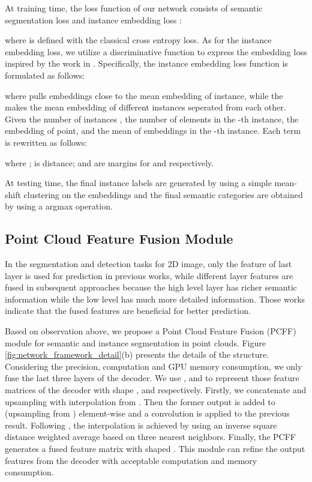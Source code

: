 \documentclass[letterpaper]{article} \usepackage{aaai20}  \usepackage{times}  \usepackage{helvet} \usepackage{courier}  \usepackage[hyphens]{url}  \usepackage{graphicx} \urlstyle{rm} \def\UrlFont{\rm}  \usepackage{graphicx}  \frenchspacing  \setlength{\pdfpagewidth}{8.5in}  \setlength{\pdfpageheight}{11in}
\begin{document}
At training time, the loss function  of our network consists of semantic segmentation loss  and instance embedding loss :

where  is defined with the classical cross entropy loss. As for the instance embedding loss, we utilize a discriminative function to express the embedding loss  inspired by the work in \cite{de2017semantic}. Specifically, the instance embedding loss function is formulated as follows:

where  pulls embeddings close to the mean embedding of instance, while the  makes the mean embedding of different instances seperated from each other. Given the number of instances , the number of elements  in the -th instance, the embedding  of point, and the mean of embeddings  in the -th instance. Each term is rewritten as follows:


where ;  is  distance;  and  are margins for  and  respectively.

At testing time, the final instance labels are generated by using a simple mean-shift clustering \cite{comaniciu2002mean} on the embeddings and the final semantic categories are obtained by using a argmax operation.

\subsection{Point Cloud Feature Fusion Module}
In the segmentation and detection tasks for 2D image, only the feature of last layer is used for prediction in previous works, while different layer features are fused in subsequent approaches  \cite{Lin_2017_CVPR,he2017mask,deeplabv3plus2018} because the high level layer has richer semantic information while the low level has much more detailed information. Those works indicate that the fused features are beneficial for better prediction.

Based on observation above, we propose a Point Cloud Feature Fusion (PCFF) module for semantic and instance segmentation in point clouds. Figure \ref{fig:network_framework_detail}(b) presents the details of the structure. Considering the precision, computation and GPU memory consumption, we only fuse the last three layers of the decoder. We use ,  and  to represent those feature matrices of the decoder with shape ,  and  respectively. Firstly, we concatenate  and  upsampling with interpolation from . Then the former output is added to  (upsampling from ) element-wise and a convolution is applied to the previous result. Following \cite{qi2017pointnet++}, the interpolation is achieved by using an inverse square distance weighted average based on three nearest neighbors. Finally, the PCFF generates a fused feature matrix with shaped . This module can refine the output features from the decoder with acceptable computation and memory consumption.
\end{document}
